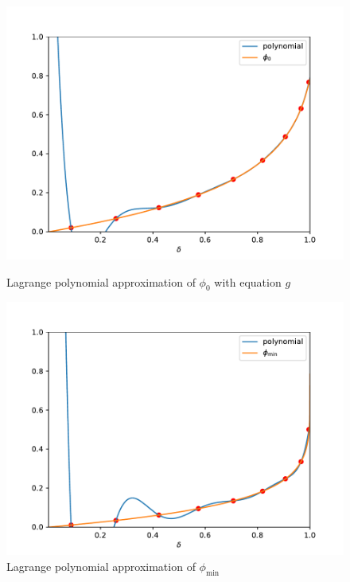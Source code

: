 \begin{figure}[H]
    \centering
    \begin{minipage}{0.45\textwidth}
        \centering
        \includegraphics[scale=0.45]{plots/phi0_lagrange.pdf}
        \caption{Lagrange polynomial approximation of $\phi_0$ with equation $g$}\label{phi0lg}
    \end{minipage}\hfill
    \begin{minipage}{0.45\textwidth}
        \centering
        \includegraphics[scale=0.45]{plots/phimin_lagrange.pdf}
        \caption{Lagrange polynomial approximation of $\phi_\mathrm{min}$}\label{phimlg}
    \end{minipage}
\end{figure}

